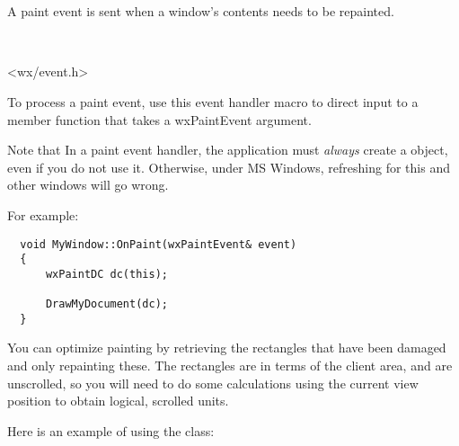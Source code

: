 \section{}\label{wxpaintevent}

A paint event is sent when a window's contents needs to be repainted.


\\


<wx/event.h>


To process a paint event, use this event handler macro to direct input to a member
function that takes a wxPaintEvent argument.

\twocolwidtha{7cm}
\begin{twocollist}\itemsep=0pt
\end{twocollist}%




Note that In a paint event handler, the application must {\it always} create a  object,
even if you do not use it. Otherwise, under MS Windows, refreshing for this and other windows will go wrong.

For example:

\small{%
\begin{verbatim}
  void MyWindow::OnPaint(wxPaintEvent& event)
  {
      wxPaintDC dc(this);

      DrawMyDocument(dc);
  }
\end{verbatim}
}%

You can optimize painting by retrieving the rectangles
that have been damaged and only repainting these. The rectangles are in
terms of the client area, and are unscrolled, so you will need to do
some calculations using the current view position to obtain logical,
scrolled units.

Here is an example of using the  class:

